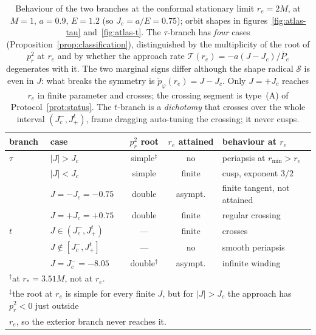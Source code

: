 \documentclass[12pt]{iopart}
\theoremstyle{plain}
\theoremstyle{definition}
\theoremstyle{remark}
\newcommand{\re}{r_{e}}
\begin{document}
\begin{table}[ht]
    \centering
    \small
    \caption{Behaviour of the two branches at the conformal stationary limit
    $\re=2M$, at $M=1$, $a=0.9$, $E=1.2$ (so $J_c=a/E=0.75$); orbit shapes in
    figures~\ref{fig:atlas-tau} and~\ref{fig:atlas-t}. The $\tau$-branch has
    \emph{four} cases (Proposition~\ref{prop:classification}), distinguished by
    the multiplicity of the root of $p_r^2$ at $\re$ and by whether the approach
    rate $\mathcal T(\re)=-a(J-J_c)/\bar P_e$ degenerates with it. The two
    marginal signs differ although the shape radical $\mathcal S$ is even in $J$:
    what breaks the symmetry is $\tilde p_\varphi(\re)=J-J_c$. Only $J=+J_c$
    reaches $\re$ in finite parameter and crosses; the crossing segment is
    type~(A) of Protocol~\ref{prot:status}. The $t$-branch is a \emph{dichotomy}
    that crosses over the whole interval $(J_c^-,J_+^t)$, frame dragging
    auto-tuning the crossing; it never cusps.}
    \label{tab:penetration}
    \footnotesize
    \begin{tabular}{llccl}
    \hline
    branch & case & $p_r^2$ root & $\re$ attained & behaviour at $\re$ \\
    \hline
    $\tau$ & $|J|>J_c$        & simple$^{\ddagger}$ & no      & periapsis at $r_{\min}>\re$ \\
           & $|J|<J_c$        & simple & finite  & cusp, exponent $3/2$ \\
           & $J=-J_c=-0.75$   & double & asympt. & finite tangent, not attained \\
           & $J=+J_c=+0.75$   & double & finite  & regular crossing \\
    \hline
    $t$    & $J\in(J_c^-,J_+^t)$    & ---    & finite  & crosses \\
           & $J\notin[J_c^-,J_+^t]$ & ---    & no      & smooth periapsis \\
           & $J=J_c^-=-8.05$        & double$^{\dagger}$ & asympt. & infinite winding \\
    \hline
    \multicolumn{5}{l}{\footnotesize $^{\dagger}$at $r_*=3.51M$, not at $\re$.}\\
    \multicolumn{5}{l}{\footnotesize $^{\ddagger}$the root at $\re$ is simple for
    every finite $J$, but for $|J|>J_c$ the approach has $p_r^2<0$ just outside}\\
    \multicolumn{5}{l}{\footnotesize \phantom{$^{\ddagger}$}$\re$, so the exterior
    branch never reaches it.}
    \end{tabular}
\end{table}
\end{document}
